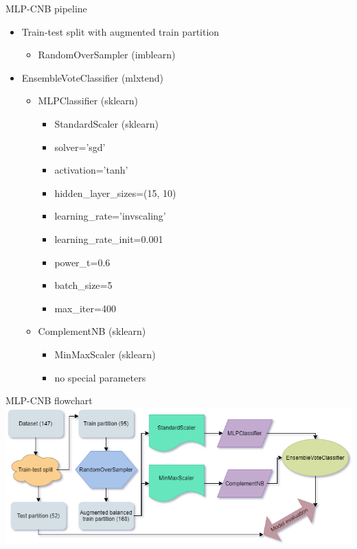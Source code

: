 \documentclass[hyperref={bookmarks=false}]{beamer}
\begin{document}
\begin{frame}{MLP-CNB pipeline}
\begin{itemize}
    \item Train-test split with augmented train partition
    \begin{itemize}
        \item RandomOverSampler (imblearn)
    \end{itemize}
    
    \item EnsembleVoteClassifier (mlxtend)
    \begin{itemize}
        \item MLPClassifier (sklearn)
        \begin{itemize}
            \item StandardScaler (sklearn)
            \item solver='sgd'
            \item activation='tanh'
            \item hidden\_layer\_sizes=(15, 10)
            \item learning\_rate='invscaling'
            \item learning\_rate\_init=0.001
            \item power\_t=0.6
            \item batch\_size=5
            \item max\_iter=400
        \end{itemize}
        
        \item ComplementNB (sklearn)
        \begin{itemize}
            \item MinMaxScaler (sklearn)
            \item no special parameters
        \end{itemize}
    \end{itemize}
\end{itemize}
\end{frame}

\begin{frame}{MLP-CNB flowchart}
\includegraphics[width=\textwidth]{flowchart.png}
\end{frame}
\end{document}
